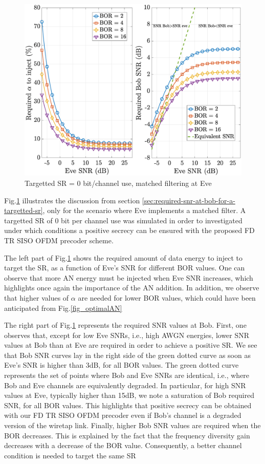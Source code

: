 \documentclass[journal,comsoc]{IEEEtran}
\let\MYoriglatexcaption\caption
\renewcommand{\caption}[2][\relax]{\MYoriglatexcaption[#2]{#2}}
\begin{document}
\begin{figure}[h!t]
	\centering
	\includegraphics[width=1\linewidth]{graphs/SISO_no_corr_targettedSR_0_model2.eps}
	\caption{Targetted SR = 0 bit/channel use, matched filtering at Eve}
	\label{fig_targettedSR}
\end{figure} 
Fig.\ref{fig_targettedSR} illustrates the discussion from section \ref{sec:required-snr-at-bob-for-a-targetted-sr}, only for the scenario where Eve implements a matched filter. A targetted SR of 0 bit per channel use was simulated in order to investigated under which conditions a positive secrecy can be ensured with the proposed FD TR SISO OFDM precoder scheme.

The left part of Fig.\ref{fig_targettedSR} shows the required amount of data energy to inject to target the SR, as a function of Eve's SNR for different BOR values. One can observe that more AN energy must be injected when Eve SNR increases, which highlights once again  the importance of the AN addition. In addition, we observe that higher values of $\alpha$ are needed for lower BOR values, which could have been anticipated from Fig.\ref{fig_optimalAN}

The right part of Fig.\ref{fig_targettedSR} represents the required SNR values at Bob. First, one observes that, except for low Eve SNRs, i.e., high AWGN energies, lower SNR values at Bob than at Eve are required in order to achieve a positive SR. We see that Bob SNR curves lay in the right side of the green dotted curve as soon as Eve's SNR is higher than 3dB, for all BOR values. The green dotted curve represents the set of points where Bob and Eve SNRs are identical, i.e., where Bob and Eve channels are equivalently degraded. In particular, for high SNR values at Eve, typically higher than 15dB, we note a saturation of Bob required SNR, for all BOR values. This highlights that positive secrecy can be obtained with our FD TR SISO OFDM precoder even if Bob's channel is a degraded version of the wiretap link. Finally, higher Bob SNR values are required when the BOR decreases. This is explained by the fact that the frequency diversity gain decreases with a decrease of the BOR value. Consequently, a better channel condition is needed to target the same SR 
\end{document}
